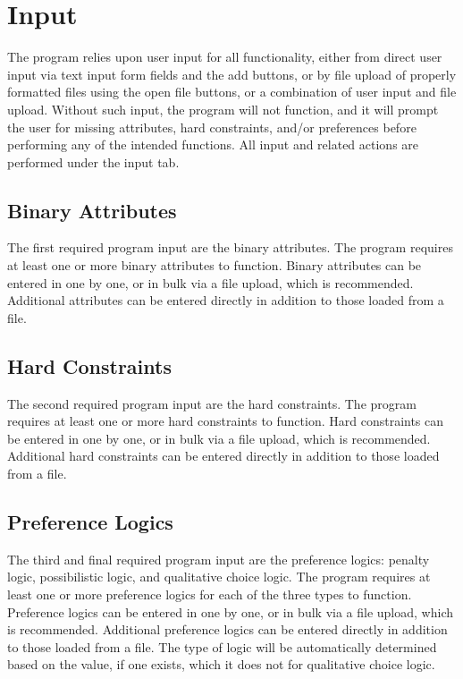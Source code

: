\documentclass[12pt]{report}
\begin{document}
\chapter{Input}
The program relies upon user input for all functionality, either from direct user input via text input form fields and the add buttons, or by file upload of properly formatted files using the open file buttons, or a combination of user input and file upload. Without such input, the program will not function, and it will prompt the user for missing attributes, hard constraints, and/or preferences before performing any of the intended functions. All input and related actions are performed under the input tab.

\section{Binary Attributes}
The first required program input are the binary attributes. The program requires at least one or more binary attributes to function. Binary attributes can be entered in one by one, or in bulk via a file upload, which is recommended. Additional attributes can be entered directly in addition to those loaded from a file.

\section{Hard Constraints}
The second required program input are the hard constraints. The program requires at least one or more hard constraints to function. Hard constraints can be entered in one by one, or in bulk via a file upload, which is recommended. Additional hard constraints can be entered directly in addition to those loaded from a file.

\section{Preference Logics}
The third and final required program input are the preference logics: penalty logic, possibilistic logic, and qualitative choice logic. The program requires at least one or more preference logics for each of the three types to function. Preference logics can be entered in one by one, or in bulk via a file upload, which is recommended. Additional preference logics can be entered directly in addition to those loaded from a file. The type of logic will be automatically determined based on the value, if one exists, which it does not for qualitative choice logic.
\end{document}
